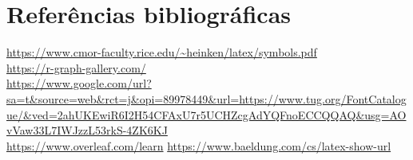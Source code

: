\documentclass[17pt]{extarticle}
\begin{document}
\newpage
\section{Referências bibliográficas}
\url{https://www.cmor-faculty.rice.edu/~heinken/latex/symbols.pdf} \\
\url{https://r-graph-gallery.com/} \\
\url{https://www.google.com/url?sa=t&source=web&rct=j&opi=89978449&url=https://www.tug.org/FontCatalogue/&ved=2ahUKEwiR6I2H54CFAxU7r5UCHZcgAdYQFnoECCQQAQ&usg=AOvVaw33L7IWJzzL53rkS-4ZK6KJ} \\
\url{https://www.overleaf.com/learn}
\url{https://www.baeldung.com/cs/latex-show-url}
\end{document}
